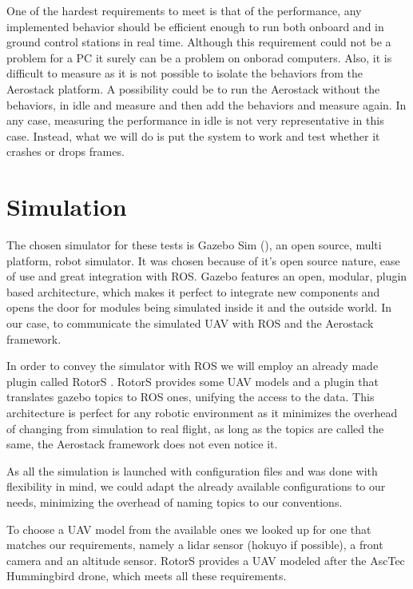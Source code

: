   One of the hardest requirements to meet is that of the performance, any implemented behavior should be efficient enough to run both onboard and in ground control stations in real time. Although this requirement could not be a problem for a PC it surely can be a problem on onborad computers. Also, it is difficult to measure as it is not possible to isolate the behaviors from the Aerostack platform. A possibility could be to run the Aerostack without the behaviors, in idle and measure and then add the behaviors and measure again. In any case, measuring the performance in idle is not very representative in this case. Instead, what we will do is put the system to work and test whether it crashes or drops frames.

\section{Simulation} \label{ch_5:sect:simulation}

  The chosen simulator for these tests is Gazebo Sim (\cite{gazebo_web}), an open source, multi platform, robot simulator. It was chosen because of it's open source nature, ease of use and great integration with ROS. Gazebo features an open, modular, plugin based architecture, which makes it perfect to integrate new components and opens the door for modules being simulated inside it and the outside world. In our case, to communicate the simulated UAV with ROS and the Aerostack framework.

  In order to convey the simulator with ROS we will employ an already made plugin called RotorS \cite{rotors2016}. RotorS provides some UAV models and a plugin that translates gazebo topics to ROS ones, unifying the access to the data. This architecture is perfect for any robotic environment as it minimizes the overhead of changing from simulation to real flight, as long as the topics are called the same, the Aerostack framework does not even notice it.

  As all the simulation is launched with configuration files and was done with flexibility in mind, we could adapt the already available configurations to our needs, minimizing the overhead of naming topics to our conventions.

  To choose a UAV model from the available ones we looked up for one that matches our requirements, namely a lidar sensor (hokuyo if possible), a front camera and an altitude sensor. RotorS provides a UAV modeled after the AscTec Hummingbird \cite{hummingbird_web} drone, which meets all these requirements.

